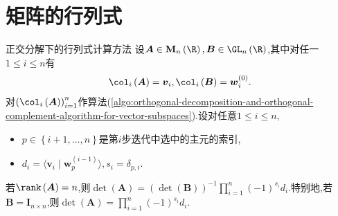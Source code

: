 \section{矩阵的行列式}

\begin{theorem}{正交分解下的行列式计算方法}{}
	设$\boldsymbol{A}\in\mathbf{M}_{n}\left(\R\right),\boldsymbol{B}\in\GL_{n}\left(\R\right)$,其中对任一$1\leq i\leq n$有
	\begin{align*}
		\col_{i}\left(\boldsymbol{A}\right)=\boldsymbol{v}_{i},\col_{i}\left(\boldsymbol{B}\right)=\boldsymbol{w}_{i}^{\left(0\right)}.
	\end{align*}
	对$\left(\col_{i}\left(\boldsymbol{A}\right)\right)_{i=1}^{n}$作算法(\ref{algo:orthogonal-decomposition-and-orthogonal-complement-algorithm-for-vector-subspaces}).设对任意$1\leq i\leq n$,
	\begin{itemize}
		\item $p\in\left\{i+1,\ldots,n\right\}$是第$i$步迭代中选中的主元的索引,
		\item $d_{i}=\langle \boldsymbol{v}_{i}\mid\boldsymbol{w}_{p}^{\left(i-1\right)}\rangle,s_{i}=\delta_{p,i}$.
	\end{itemize}
	若$\rank\left(\boldsymbol{A}\right)=n$,则$\det\left(\boldsymbol{A}\right)=\left(\det\left(\boldsymbol{B}\right)\right)^{-1}\prod\limits_{i=1}^{n}\left(-1\right)^{s_{i}}d_{i}$.特别地,若$\boldsymbol{B}=\boldsymbol{I}_{n\times n}$,则$\det\left(\boldsymbol{A}\right)=\prod\limits_{i=1}^{n}\left(-1\right)^{s_{i}}d_{i}$.
\end{theorem}